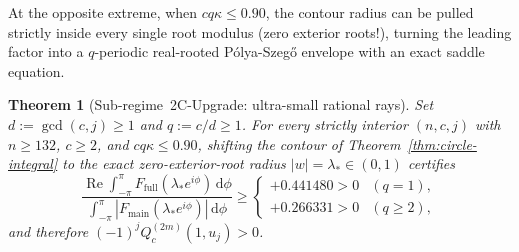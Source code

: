 \documentclass[10pt]{article}
\numberwithin{equation}{section}
\theoremstyle{plain}
\newtheorem{theorem}{Theorem}[section]
\theoremstyle{definition}
\newcommand{\dd}{\mathrm{d}}
\newcommand{\1}{\mathbf{1}}
\DeclareMathOperator{\re}{Re}
\begin{document}
At the opposite extreme, when $c q \kappa \le 0.90$, the contour radius can be pulled strictly inside every single root modulus (zero exterior roots!), turning the leading factor into a $q$-periodic real-rooted P\'olya-Szeg\H{o} envelope with an exact saddle equation.

\begin{theorem}[Sub-regime~2C-Upgrade: ultra-small rational rays]\label{thm:R2-2C}
Set $d := \gcd(c, j) \ge 1$ and $q := c/d \ge 1$. For every strictly interior $(n, c, j)$ with $n \ge 132$, $c \ge 2$, and $c q \kappa \le 0.90$, shifting the contour of Theorem~\ref{thm:circle-integral} to the exact zero-exterior-root radius $|w| = \lambda_* \in (0, 1)$ certifies
\[
\frac{\re\int_{-\pi}^{\pi} F_{\mathrm{full}}(\lambda_* e^{i\phi})\,\dd\phi}{\int_{-\pi}^{\pi} |F_{\mathrm{main}}(\lambda_* e^{i\phi})|\,\dd\phi} \ge
\begin{cases}
+0.441480 > 0 & (q = 1), \\
+0.266331 > 0 & (q \ge 2),
\end{cases}
\]
and therefore $(-1)^j Q_c^{(2m)}(1, u_j) > 0$.
\end{theorem}
\end{document}
